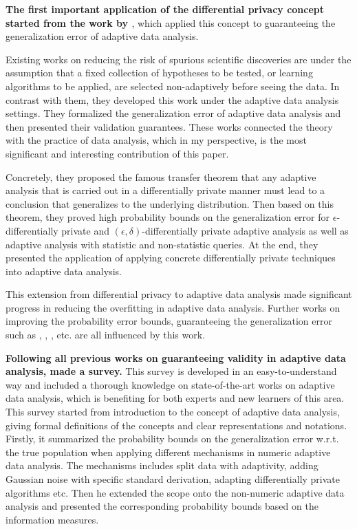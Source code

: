 \documentclass{article}
\begin{document}
\textbf{The first important application of the differential privacy concept started from the work by \cite{dwork2015preserving}}, which applied this concept to guaranteeing the generalization error of adaptive data analysis. 

Existing works on reducing the risk of spurious scientific discoveries are under the assumption that a fixed collection of hypotheses to be tested, or learning algorithms to be applied, are selected non-adaptively before seeing the data. In contrast with them, they developed this work under the adaptive data analysis settings. They formalized the generalization error of adaptive data analysis and then presented their validation guarantees. These works connected the theory with the practice of data analysis, which in my perspective, is the most significant and interesting contribution of this paper. 

Concretely, they proposed the famous transfer theorem that any adaptive analysis that is carried out in a differentially private manner must lead to a conclusion that generalizes to the underlying distribution.
Then based on this theorem, they proved high probability bounds on the generalization error for $\epsilon$-differentially private and $(\epsilon,\delta)$-differentially private adaptive analysis as well as adaptive analysis with statistic and non-statistic queries.
At the end, they presented the application of applying concrete differentially private techniques into adaptive data analysis.

This extension from differential privacy to adaptive data analysis made significant progress in reducing the overfitting in adaptive data analysis. Further works on improving the probability error bounds, guaranteeing the generalization error such as \cite{dwork2015generalization}, \cite{bassily2016algorithmic}, \cite{dwork2015reusable}, \cite{jung2019new} etc. are all influenced by this work.

\textbf{Following all previous works on guaranteeing validity in adaptive data analysis, \cite{smith2017information} made a survey.}
This survey is developed in an easy-to-understand way and included a thorough knowledge on state-of-the-art works on adaptive data analysis, which is benefiting for both experts and new learners of this area.
This survey started from introduction to the concept of adaptive data analysis, giving formal definitions of the concepts and clear representations and notations. 
Firstly, it summarized the probability bounds on the generalization error w.r.t. the true population when applying different mechanisms in numeric adaptive data analysis.
The mechanisms includes split data with adaptivity, adding Gaussian noise with specific standard derivation, adapting differentially private algorithms etc.
Then he extended the scope onto the non-numeric adaptive data analysis and presented the corresponding probability bounds based on the information measures. 
\end{document}

